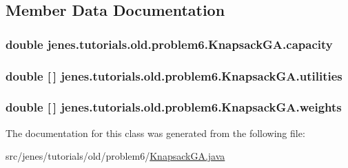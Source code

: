 \subsection{Member Data Documentation}
\hypertarget{classjenes_1_1tutorials_1_1old_1_1problem6_1_1_knapsack_g_a_ab8ad295d0154ad8ea6dfd8a70aa97325}{
\subsubsection[{capacity}]{\setlength{\rightskip}{0pt plus 5cm}double jenes.\-tutorials.\-old.\-problem6.\-Knapsack\-G\-A.\-capacity\hspace{0.3cm}{\ttfamily [private]}}}\label{classjenes_1_1tutorials_1_1old_1_1problem6_1_1_knapsack_g_a_ab8ad295d0154ad8ea6dfd8a70aa97325}
\hypertarget{classjenes_1_1tutorials_1_1old_1_1problem6_1_1_knapsack_g_a_a1e296b3ed7d413031000777f8a777a5f}{
\subsubsection[{utilities}]{\setlength{\rightskip}{0pt plus 5cm}double \mbox{[}$\,$\mbox{]} jenes.\-tutorials.\-old.\-problem6.\-Knapsack\-G\-A.\-utilities\hspace{0.3cm}{\ttfamily [private]}}}\label{classjenes_1_1tutorials_1_1old_1_1problem6_1_1_knapsack_g_a_a1e296b3ed7d413031000777f8a777a5f}
\hypertarget{classjenes_1_1tutorials_1_1old_1_1problem6_1_1_knapsack_g_a_a4ea35cb1fea0197096c91b2f225cd84a}{
\subsubsection[{weights}]{\setlength{\rightskip}{0pt plus 5cm}double \mbox{[}$\,$\mbox{]} jenes.\-tutorials.\-old.\-problem6.\-Knapsack\-G\-A.\-weights\hspace{0.3cm}{\ttfamily [private]}}}\label{classjenes_1_1tutorials_1_1old_1_1problem6_1_1_knapsack_g_a_a4ea35cb1fea0197096c91b2f225cd84a}


The documentation for this class was generated from the following file\-:\begin{DoxyCompactItemize}
\item 
src/jenes/tutorials/old/problem6/\hyperlink{old_2problem6_2_knapsack_g_a_8java}{Knapsack\-G\-A.\-java}\end{DoxyCompactItemize}
